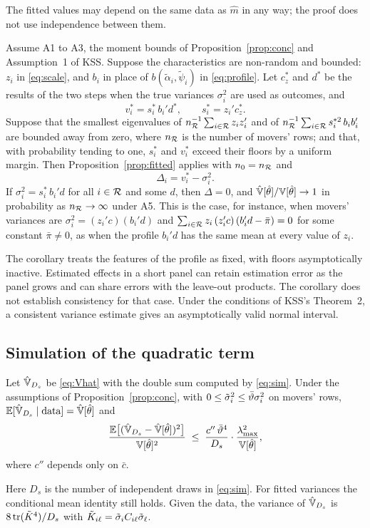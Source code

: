 The fitted values may depend on the same data as $\hat m$ in any way; the proof does not use independence
between them.

\begin{corollary}\label{cor:transfer}
Assume A1 to A3, the moment bounds of Proposition~\ref{prop:conc} and Assumption~1 of KSS. Suppose the
characteristics are non-random and bounded: $z_i$ in \eqref{eq:scale}, and $b_i$ in place of
$b(\tilde\alpha_i,\tilde\psi_i)$ in \eqref{eq:profile}. Let $c_z^*$ and $d^*$ be the results of the two steps when
the true variances $\sigma_i^2$ are used as outcomes, and
\[
v_i^*=s_i^*\,b_i'd^*,\qquad s_i^*=z_i'c_z^* .
\]
Suppose that the smallest eigenvalues of $n_{\mathcal{R}}^{-1}\sum_{i\in\mathcal{R}}z_iz_i'$ and of
$n_{\mathcal{R}}^{-1}\sum_{i\in\mathcal{R}}s_i^{*2}\,b_ib_i'$ are bounded away from zero, where $n_{\mathcal{R}}$ is the number of movers'
rows; and that, with probability tending to one, $s_i^*$ and $v_i^*$ exceed their floors by a uniform margin.
Then Proposition~\ref{prop:fitted} applies with $n_0=n_{\mathcal{R}}$ and
\[
\Delta_i=v_i^*-\sigma_i^2 .
\]
If $\sigma_i^2=s_i^*\,b_i'd$ for all $i\in\mathcal{R}$ and some $d$, then $\Delta=0$, and
$\hat{\mathbb{V}}[\hat\theta]/\mathbb{V}[\hat\theta]\to1$ in probability as $n_{\mathcal{R}}\to\infty$ under A5. This is the case, for
instance, when movers' variances are $\sigma_i^2=(z_i'c)(b_i'd)$ and
$\sum_{i\in\mathcal{R}}z_i\,(z_i'c)\,(b_i'd-\bar\pi)=0$ for some constant $\bar\pi\neq0$, as when the profile $b_i'd$ has
the same mean at every value of $z_i$.
\end{corollary}


The corollary treats the features of the profile as fixed, with floors asymptotically inactive.
Estimated effects in a short panel can retain estimation error as the panel grows and can share
errors with the leave-out products. The corollary does not establish consistency for that case.
Under the conditions of KSS's Theorem~2, a consistent variance estimate gives an
asymptotically valid normal interval.
\subsection{Simulation of the quadratic term}
\begin{proposition}\label{prop:sim}
Let $\hat{\mathbb{V}}_{D_s}$ be \eqref{eq:Vhat} with the double sum computed by \eqref{eq:sim}. Under the assumptions of
Proposition~\ref{prop:conc}, with $0\le\tilde\sigma_i^2\le\bar\vartheta\sigma_i^2$ on movers' rows,
$\mathbb{E}[\hat{\mathbb{V}}_{D_s}\mid\text{data}]=\hat{\mathbb{V}}[\hat\theta]$ and
\[
\frac{\mathbb{E}\big[(\hat{\mathbb{V}}_{D_s}-\hat{\mathbb{V}}[\hat\theta])^2\big]}{\mathbb{V}[\hat\theta]^2}\;\le\;\frac{c''\,\bar\vartheta^4}{D_s}\cdot\frac{\lambda_{\max}^2}{\mathbb{V}[\hat\theta]} ,
\]
where $c''$ depends only on $\bar c$.
\end{proposition}
Here $D_s$ is the number of independent draws in \eqref{eq:sim}. For fitted variances the conditional mean
identity still holds. Given the data, the variance of $\hat{\mathbb{V}}_{D_s}$ is $8\operatorname{tr}(\tilde K^4)/D_s$ with
$\tilde K_{i\ell}=\tilde\sigma_i C_{i\ell}\tilde\sigma_\ell$.

